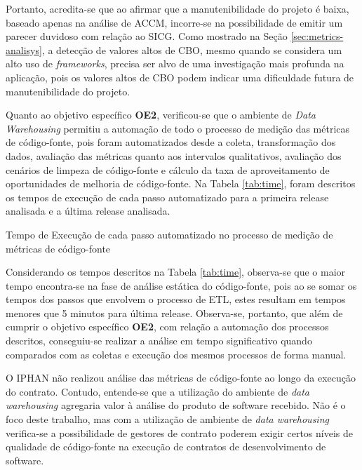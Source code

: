 Portanto, acredita-se que ao afirmar que a manutenibilidade do projeto é baixa, baseado apenas na análise de ACCM, incorre-se na possibilidade de emitir um parecer duvidoso com relação ao SICG. Como mostrado na Seção \ref{sec:metrics-analisys}, a detecção de valores altos de CBO, mesmo quando se considera um alto uso de \textit{frameworks}, precisa ser alvo de uma investigação mais profunda na aplicação, pois os valores altos de CBO podem indicar uma dificuldade futura de manutenibilidade do projeto.

Quanto ao objetivo específico \textbf{OE2}, verificou-se que o ambiente de \textit{Data Warehousing} permitiu a automação de todo o processo de medição das métricas de código-fonte, pois foram automatizados desde a coleta, transformação dos dados, avaliação das métricas quanto aos intervalos qualitativos, avaliação dos cenários de limpeza de código-fonte e cálculo da taxa de aproveitamento de oportunidades de melhoria de código-fonte. Na Tabela \ref{tab:time}, foram descritos os tempos de execução de cada passo automatizado para a primeira release analisada e a última release analisada.

\begin{table}[!ht]
\centering

\caption{Tempo de Execução de cada passo automatizado no processo de medição de métricas de código-fonte}
\label{tab:time}
\end{table}
\FloatBarrier

Considerando os tempos descritos na Tabela \ref{tab:time}, observa-se que o maior tempo encontra-se na fase de análise estática do código-fonte, pois ao se somar os tempos dos passos que envolvem o processo de ETL, estes resultam em tempos menores que 5 minutos para última release. Observa-se, portanto, que além de cumprir o objetivo específico \textbf{OE2}, com relação a automação dos processos descritos, conseguiu-se realizar a análise em tempo significativo quando comparados com as coletas e execução dos mesmos processos de forma manual.

O IPHAN não realizou análise das métricas de código-fonte ao longo da execução do contrato. Contudo, entende-se que a utilização do ambiente de \textit{data warehousing} agregaria valor à análise do produto de software recebido. Não é o foco deste trabalho, mas com a utilização de ambiente de \textit{data warehousing} verifica-se a possibilidade de gestores de contrato poderem exigir certos níveis de qualidade de código-fonte na execução de contratos de desenvolvimento de software.  

